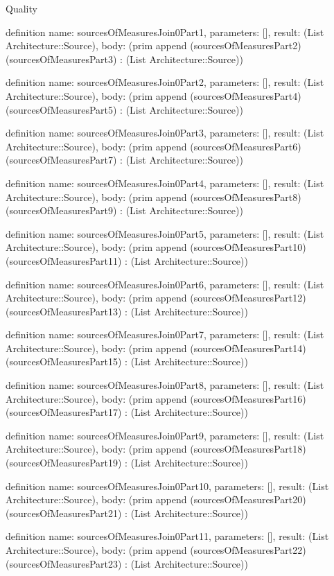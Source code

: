 \begin{lexlean}{Quality}
\begin{semanticmodule}
definition{
  name: sourcesOfMeasuresJoin0Part1,
  parameters: [],
  result: (List Architecture::Source),
  body: (prim append (sourcesOfMeasuresPart2) (sourcesOfMeasuresPart3) : (List Architecture::Source))
}

definition{
  name: sourcesOfMeasuresJoin0Part2,
  parameters: [],
  result: (List Architecture::Source),
  body: (prim append (sourcesOfMeasuresPart4) (sourcesOfMeasuresPart5) : (List Architecture::Source))
}

definition{
  name: sourcesOfMeasuresJoin0Part3,
  parameters: [],
  result: (List Architecture::Source),
  body: (prim append (sourcesOfMeasuresPart6) (sourcesOfMeasuresPart7) : (List Architecture::Source))
}

definition{
  name: sourcesOfMeasuresJoin0Part4,
  parameters: [],
  result: (List Architecture::Source),
  body: (prim append (sourcesOfMeasuresPart8) (sourcesOfMeasuresPart9) : (List Architecture::Source))
}

definition{
  name: sourcesOfMeasuresJoin0Part5,
  parameters: [],
  result: (List Architecture::Source),
  body: (prim append (sourcesOfMeasuresPart10) (sourcesOfMeasuresPart11) : (List Architecture::Source))
}

definition{
  name: sourcesOfMeasuresJoin0Part6,
  parameters: [],
  result: (List Architecture::Source),
  body: (prim append (sourcesOfMeasuresPart12) (sourcesOfMeasuresPart13) : (List Architecture::Source))
}

definition{
  name: sourcesOfMeasuresJoin0Part7,
  parameters: [],
  result: (List Architecture::Source),
  body: (prim append (sourcesOfMeasuresPart14) (sourcesOfMeasuresPart15) : (List Architecture::Source))
}

definition{
  name: sourcesOfMeasuresJoin0Part8,
  parameters: [],
  result: (List Architecture::Source),
  body: (prim append (sourcesOfMeasuresPart16) (sourcesOfMeasuresPart17) : (List Architecture::Source))
}

definition{
  name: sourcesOfMeasuresJoin0Part9,
  parameters: [],
  result: (List Architecture::Source),
  body: (prim append (sourcesOfMeasuresPart18) (sourcesOfMeasuresPart19) : (List Architecture::Source))
}

definition{
  name: sourcesOfMeasuresJoin0Part10,
  parameters: [],
  result: (List Architecture::Source),
  body: (prim append (sourcesOfMeasuresPart20) (sourcesOfMeasuresPart21) : (List Architecture::Source))
}

definition{
  name: sourcesOfMeasuresJoin0Part11,
  parameters: [],
  result: (List Architecture::Source),
  body: (prim append (sourcesOfMeasuresPart22) (sourcesOfMeasuresPart23) : (List Architecture::Source))
}


\end{semanticmodule}
\end{lexlean}
